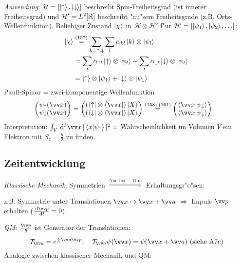 \documentclass[a4paper]{scrartcl}
\begin{document}
{\emph{Anwendung}: $\mathcal H = [ \ket \uparrow, \ket \downarrow]$ beschreibt Spin-Freiheitsgrad (ist innerer Freiheitsgrad) und $\mathcal H' = L^2[\mathbb{R}]$ beschreibt "au"sere Freiheitsgrade (z.B. Orts-Wellenfunktion). Beliebiger Zustand $\ket \chi$ in $\mathcal H \otimes \mathcal H'$ f"ur $\mathcal H' = [ \ket{\psi_1}, \ket{\psi_2}, \ldots ]$:
\begin{align}
\begin{split}
\ket \chi & \stackrel{(157)}= \sum_{k=\uparrow, \downarrow} \sum_l \alpha_{kl} \ket k \otimes \ket{\psi_l} \\
& = \sum_l \alpha_{\uparrow l} \ket \uparrow \otimes \ket{\psi_l} + \sum_l \alpha_{\downarrow l} \ket \downarrow \otimes \ket{\psi_l} \\
& = \ket \uparrow \otimes \ket{\psi_\uparrow} + \ket \downarrow \otimes \ket{\psi_\downarrow}
\end{split}
\end{align}
Pauli-Spinor = zwei-komponentige Wellenfunktion
\begin{align}
\matr{ \psi_\uparrow(\vv x) \\ \psi_\downarrow(\vv  x) } & = \matr{( \bra \uparrow \otimes \bra{\vv x}) \ket X \\ ( \bra \downarrow \otimes \bra{ \vv x}) \ket X} \stackrel{(158),(161)}= \matr{ \braket{ \vv x | \psi_\downarrow} \\ \braket{ \vv x | \psi_\downarrow}}
\end{align}
Interpretation: $\int_V \dd^3 \vv x \, \vert \braket{ x | \psi_\uparrow} \vert^2 = $ Wahrscheinlichkeit im Volumen $V$ ein Elektron mit $S_z = \frac \hbar 2$ zu finden.

\subsection{Zeitentwicklung}

\emph{Klassische Mechanik}: Symmetrien $\stackrel{\mathrm{Noether-Thm}}\Longrightarrow$ Erhaltungsgr"o"sen.

z.B. Symmetrie unter Translationen $\vv x \mapsto \vv x + \vv a$ $\Longrightarrow$ Impuls $\vv p$ erhalten ($\frac{\dd \vv p}{\dd t} = 0$).

\emph{QM}: $\frac{\vv p }{\hbar}$ ist Generator der Translationen:
\begin{align}
\mathcal T _{\vv a}= e^{\frac i \hbar \vv a \vv p}; \quad \mathcal T _{\vv a} \psi(\vv x) = \psi(\vv x + \vv a) \ (\mathrm{siehe \ A 7c})
\end{align}
Analogie zwischen klassischer Mechanik und QM:

}
\end{document}
